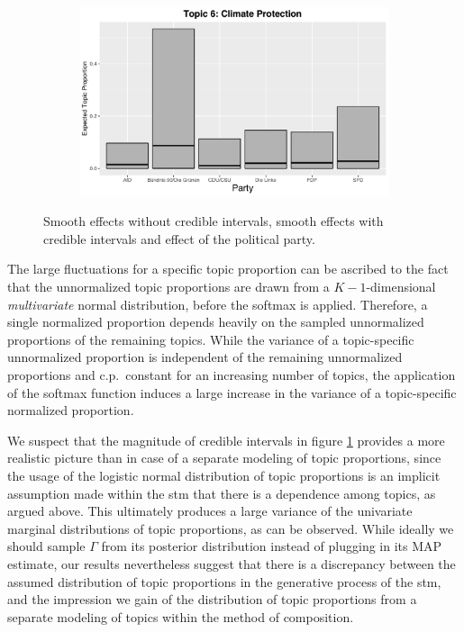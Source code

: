 \begin{figure}[h!]
\begin{subfigure}[b]{0.3\linewidth}
    \includegraphics[width=\linewidth]{../plots/4_4/direct_t6_cat.pdf}
  \end{subfigure}
  \caption{Smooth effects without credible intervals, smooth effects with credible intervals and effect of the political party.}
  \label{fig:directassessment}
\end{figure}

The large fluctuations for a specific topic proportion can be ascribed to the fact that the unnormalized topic proportions are drawn from a $K-1$-dimensional \textit{multivariate} normal distribution, before the softmax is applied. Therefore, a single normalized proportion depends heavily on the sampled unnormalized proportions of the remaining topics. While the variance of a topic-specific unnormalized proportion is independent of the remaining unnormalized proportions and c.p.\ constant for an increasing number of topics, the application of the softmax function induces a large increase in the variance of a topic-specific normalized proportion.

We suspect that the magnitude of credible intervals in figure \ref{fig:directassessment} provides a more realistic picture than in case of a separate modeling of topic proportions, since the usage of the logistic normal distribution of topic proportions is an implicit assumption made within the stm that there is a dependence among topics, as argued above. This ultimately produces a large variance of the univariate marginal distributions of topic proportions, as can be observed. While ideally we should sample $\Gamma$ from its posterior distribution instead of plugging in its MAP estimate, our results nevertheless suggest that there is a discrepancy between the assumed distribution of topic proportions in the generative process of the stm, and the impression we gain of the distribution of topic proportions from a separate modeling of topics within the method of composition.

